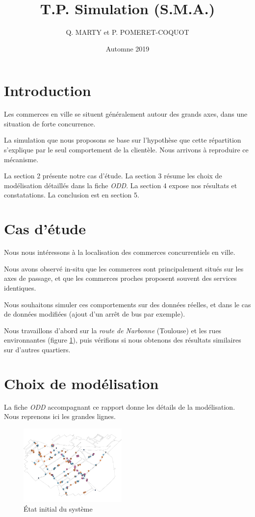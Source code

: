 \documentclass[11pt]{article}
\author{Q. MARTY et P. POMERET-COQUOT}
\date{Automne 2019}
\title{T.P. Simulation (S.M.A.)}
\begin{document}
\maketitle

\section{Introduction}
\label{sec:org9b3f6ac}

Les commerces en ville se situent généralement autour des grands axes,
dans une situation de forte concurrence.

La simulation que nous proposons se base sur l'hypothèse que cette répartition
s'explique par le seul comportement de la clientèle. 
Nous arrivons à reproduire ce mécanisme.

La section 2 présente notre cas d'étude. 
La section 3 résume les choix de modélisation détaillés dans la fiche \emph{ODD}. 
La section 4 expose nos résultats et constatations.
La conclusion est en section 5.

\section{Cas d'étude}
\label{sec:org33fbf51}

Nous nous intéressons à la localisation des commerces concurrentiels en ville.

Nous avons observé in-situ que les commerces sont principalement situés sur les axes de passage,
et que les commerces proches proposent souvent des services identiques.

Nous souhaitons simuler ces comportements sur des données réelles, et dans le cas de données
modifiées (ajout d'un arrêt de bus par exemple).

Nous travaillons d'abord sur la \emph{route de Narbonne} (Toulouse) et les rues environnantes (figure \ref{fig:orga17fbd9}),
puis vérifions si nous obtenons des résultats similaires sur d'autres quartiers.

\section{Choix de modélisation}
\label{sec:org2269d5b}
La fiche \emph{ODD} accompagnant ce rapport donne les détails de la modélisation.
Nous reprenons ici les grandes lignes.


\begin{figure}[htbp]
\centering
\includegraphics[width=200px]{./images/t=0.png}
\caption{\label{fig:orga17fbd9}
État initial du système}
\end{figure}
\end{document}
